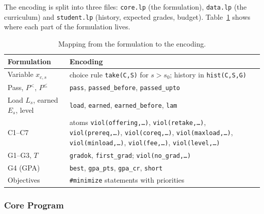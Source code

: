 The encoding is split into three files: \texttt{core.lp} (the formulation),
\texttt{data.lp} (the curriculum) and \texttt{student.lp} (history, expected
grades, budget). Table~\ref{tab:mapping} shows where each part of the
formulation lives.
 
\begin{table}[ht]
\centering
\small
\begin{tabular}{@{}p{4.2cm}>{\raggedright\arraybackslash}p{8.8cm}@{}}
\toprule
\textbf{Formulation} & \textbf{Encoding} \\
\midrule
Variable $x_{c,s}$ & choice rule \texttt{take(C,S)} for $s>s_0$; history in \texttt{hist(C,S,G)} \\
Pass, $P^{<}$, $P^{\le}$ & \texttt{pass}, \texttt{passed\_before}, \texttt{passed\_upto} \\
Load $L_s$, earned $E_s$, level & \texttt{load}, \texttt{earned}, \texttt{earned\_before}, \texttt{lam} \\
C1--C7 & atoms \texttt{viol(offering,\dots)}, \texttt{viol(retake,\dots)}, \texttt{viol(prereq,\dots)}, \texttt{viol(coreq,\dots)}, \texttt{viol(maxload,\dots)}, \texttt{viol(minload,\dots)}, \texttt{viol(fee,\dots)}, \texttt{viol(level,\dots)} \\
G1--G3, $T$ & \texttt{gradok}, \texttt{first\_grad}; \texttt{viol(no\_grad,\dots)} \\
G4 (GPA) & \texttt{best}, \texttt{gpa\_pts}, \texttt{gpa\_cr}, \texttt{short} \\
Objectives & \texttt{\#minimize} statements with priorities \\
\bottomrule
\end{tabular}
\caption{Mapping from the formulation to the encoding.}
\label{tab:mapping}
\end{table}
 
\subsubsection{Core Program}
 
